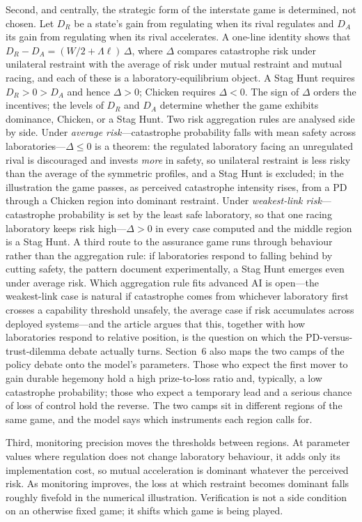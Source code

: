 \documentclass[11pt]{article}
\theoremstyle{plain}
\theoremstyle{definition}
\theoremstyle{remark}
\newcommand{\Lam}{\Lambda}
\newcommand{\Delt}{\Delta}
\begin{document}
Second, and centrally, the strategic form of the interstate game is determined, not chosen. Let $D_R$ be a state's gain from regulating when its rival regulates and $D_A$ its gain from regulating when its rival accelerates. A one-line identity shows that $D_R-D_A=(W/2+\Lam\ell)\,\Delt$, where $\Delt$ compares catastrophe risk under unilateral restraint with the average of risk under mutual restraint and mutual racing, and each of these is a laboratory-equilibrium object. A Stag Hunt requires $D_R>0>D_A$ and hence $\Delt>0$; Chicken requires $\Delt<0$. The sign of $\Delt$ orders the incentives; the levels of $D_R$ and $D_A$ determine whether the game exhibits dominance, Chicken, or a Stag Hunt. Two risk aggregation rules are analysed side by side. Under \emph{average risk}---catastrophe probability falls with mean safety across laboratories---$\Delt\le0$ is a theorem: the regulated laboratory facing an unregulated rival is discouraged and invests \emph{more} in safety, so unilateral restraint is less risky than the average of the symmetric profiles, and a Stag Hunt is excluded; in the illustration the game passes, as perceived catastrophe intensity rises, from a PD through a Chicken region into dominant restraint. Under \emph{weakest-link risk}---catastrophe probability is set by the least safe laboratory, so that one racing laboratory keeps risk high---$\Delt>0$ in every case computed and the middle region is a Stag Hunt. A third route to the assurance game runs through behaviour rather than the aggregation rule: if laboratories respond to falling behind by cutting safety, the pattern \citet{fernandez2026} document experimentally, a Stag Hunt emerges even under average risk. Which aggregation rule fits advanced AI is open---the weakest-link case is natural if catastrophe comes from whichever laboratory first crosses a capability threshold unsafely, the average case if risk accumulates across deployed systems---and the article argues that this, together with how laboratories respond to relative position, is the question on which the PD-versus-trust-dilemma debate actually turns. Section~6 also maps the two camps of the policy debate onto the model's parameters. Those who expect the first mover to gain durable hegemony hold a high prize-to-loss ratio and, typically, a low catastrophe probability; those who expect a temporary lead and a serious chance of loss of control hold the reverse. The two camps sit in different regions of the same game, and the model says which instruments each region calls for.

Third, monitoring precision moves the thresholds between regions. At parameter values where regulation does not change laboratory behaviour, it adds only its implementation cost, so mutual acceleration is dominant whatever the perceived risk. As monitoring improves, the loss at which restraint becomes dominant falls roughly fivefold in the numerical illustration. Verification is not a side condition on an otherwise fixed game; it shifts which game is being played.
\end{document}
